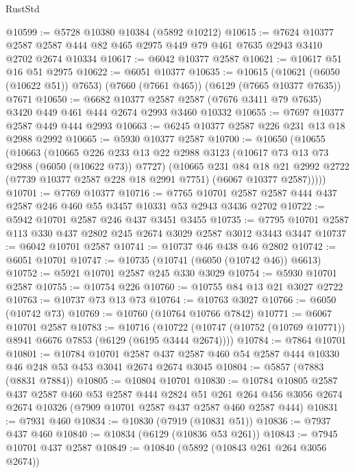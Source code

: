 \begin{lexlean}{RustStd}
\begin{coremodule}
@10599 := @5728 @10380 @10384 (@5892 @10212)
@10615 := @7624
    @10377
    @2587
    @2587
    @444
    @82
    @465
    @2975
    @449
    @79
    @461
    @7635
    @2943
    @3410
    @2702
    @2674
    @10334
@10617 := @6042 @10377 @2587
@10621 := @10617 @51 @16 @51 @2975
@10622 := @6051 @10377
@10635 := @10615
    (@10621 (@6050 (@10622 @51)) @7653)
    (@7660 (@7661 @465))
    (@6129 (@7665 @10377 @7635))
    @7671
@10650 := @6682
    @10377
    @2587
    @2587
    (@7676 @3411 @79 @7635)
    @3420
    @449
    @461
    @444
    @2674
    @2993
    @3460
    @10332
@10655 := @7697 @10377 @2587 @449 @444 @2993
@10663 := @6245 @10377 @2587 @226 @231 @13 @18 @2988 @2992
@10665 := @5930 @10377 @2587
@10700 := @10650
    (@10655
      (@10663
        (@10665
          @226
          @233
          @13
          @22
          @2988
          @3123
          (@10617 @73 @13 @73 @2988 (@6050 (@10622 @73)) @7727)
          (@10665
            @231
            @84
            @18
            @21
            @2992
            @2722
            (@7739 @10377 @2587 @228 @18 @2991 @7751)
            (@6067 @10377 @2587)))))
@10701 := @7769 @10377
@10716 := @7765 @10701 @2587 @2587 @444 @437 @2587 @246 @460 @55 @3457 @10331 @53 @2943 @3436 @2702
@10722 := @5942 @10701 @2587 @246 @437 @3451 @3455
@10735 := @7795 @10701 @2587 @113 @330 @437 @2802 @245 @2674 @3029 @2587 @3012 @3443 @3447
@10737 := @6042 @10701 @2587
@10741 := @10737 @46 @438 @46 @2802
@10742 := @6051 @10701
@10747 := @10735 (@10741 (@6050 (@10742 @46)) @6613)
@10752 := @5921 @10701 @2587 @245 @330 @3029
@10754 := @5930 @10701 @2587
@10755 := @10754 @226
@10760 := @10755 @84 @13 @21 @3027 @2722
@10763 := @10737 @73 @13 @73
@10764 := @10763 @3027
@10766 := @6050 (@10742 @73)
@10769 := @10760 (@10764 @10766 @7842)
@10771 := @6067 @10701 @2587
@10783 := @10716
    (@10722 (@10747 (@10752 (@10769 @10771)) @8941 @6676 @7853 (@6129 (@6195 @3444 @2674))))
@10784 := @7864 @10701
@10801 := @10784
    @10701
    @2587
    @437
    @2587
    @460
    @54
    @2587
    @444
    @10330
    @46
    @248
    @53
    @453
    @3041
    @2674
    @2674
    @3045
@10804 := @5857 (@7883 (@8831 @7884))
@10805 := @10804 @10701
@10830 := @10784
    @10805
    @2587
    @437
    @2587
    @460
    @53
    @2587
    @444
    @2824
    @51
    @261
    @264
    @456
    @3056
    @2674
    @2674
    @10326
    (@7909 @10701 @2587 @437 @2587 @460 @2587 @444)
@10831 := @7931 @460
@10834 := @10830 (@7919 (@10831 @51))
@10836 := @7937 @437 @460
@10840 := @10834 (@6129 (@10836 @53 @261))
@10843 := @7945 @10701 @437 @2587
@10849 := @10840 (@5892 (@10843 @261 @264 @3056 @2674))

\end{coremodule}
\end{lexlean}
